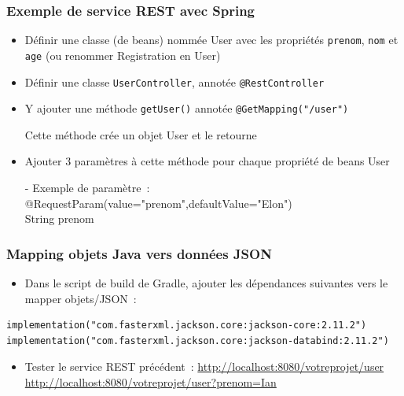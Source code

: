 \documentclass{beamer}
\begin{document}
\begin{frame}[fragile]
	\frametitle{Exemple de service REST avec Spring}
	\begin{itemize}
		\item Définir une classe (de beans) nommée User avec les propriétés \texttt{prenom}, \texttt{nom} et \texttt{age} (ou renommer Registration en User)
		\item Définir une classe \texttt{UserController}, annotée \texttt{@RestController}
		\item Y ajouter une méthode \texttt{getUser()} annotée \texttt{@GetMapping("/user")}
		\item[]Cette méthode crée un objet User et le retourne
		\item Ajouter 3 paramètres à cette méthode pour chaque propriété de beans User
		\item[-]Exemple de paramètre~:\\
		@RequestParam(value="prenom",defaultValue="Elon")\\ String prenom
	\end{itemize}
\end{frame} 

\begin{frame}[fragile]
	\frametitle{Mapping objets Java vers données JSON}
	\begin{itemize}
		\item Dans le script de build de Gradle, ajouter les dépendances suivantes vers le mapper objets/JSON~:
	\end{itemize}
\begin{lstlisting}
implementation("com.fasterxml.jackson.core:jackson-core:2.11.2")
implementation("com.fasterxml.jackson.core:jackson-databind:2.11.2")
\end{lstlisting}
	\begin{itemize}
		\item Tester le service REST précédent~:
		\url{http://localhost:8080/votreprojet/user}
		\url{http://localhost:8080/votreprojet/user?prenom=Ian}
	\end{itemize}
\end{frame} 
\end{document}

